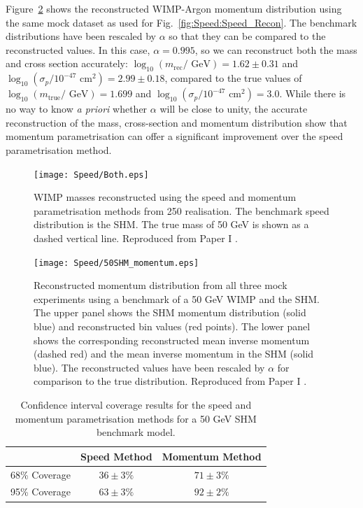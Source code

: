 Figure~\ref{fig:Speed:50SHM_momentum} shows the reconstructed WIMP-Argon momentum distribution using the same mock dataset as used for Fig.\ \ref{fig:Speed:Speed_Recon}. The benchmark distributions have been rescaled by \(\alpha\) so that they can be compared to the reconstructed values. In this case, \(\alpha = 0.995\), so we can reconstruct both the mass and cross section accurately: \(\log_{10} (m_\textrm{rec} / \textrm{ GeV}) = 1.62 \pm 0.31\) and \(\log_{10} (\sigma_p / 10^{-47} \textrm{ cm}^2) = 2.99 \pm 0.18\), compared to the true values of \(\log_{10} (m_\textrm{true} / \textrm{ GeV}) = 1.699\) and \(\log_{10} (\sigma_p / 10^{-47} \textrm{ cm}^2) = 3.0\). While there is no way to know \textit{a priori} whether \(\alpha\) will be close to unity, the accurate reconstruction of the mass, cross-section and momentum distribution show that momentum parametrisation can offer a significant improvement over the speed parametrisation method.

\begin{figure}[t]
\centering
  \texttt{[image: Speed/Both.eps]}
  \caption[Comparison of WIMP masses reconstructed using the binned speed and momentum parametrisations]{WIMP masses reconstructed using the speed and momentum parametrisation methods from 250 realisation. The benchmark speed distribution is the SHM. The true mass of 50 GeV is shown as a dashed vertical line. Reproduced from Paper I \cite{Kavanagh:2012}.}
  \label{fig:Speed:both}
\end{figure}

\begin{figure}[t]
\centering
  \texttt{[image: Speed/50SHM\_momentum.eps]}
\caption[Reconstructed momentum distribution from all three mock experiments using a benchmark of a 50 GeV WIMP and the SHM]{Reconstructed momentum distribution from all three mock experiments using a benchmark of a 50 GeV WIMP and the SHM. The upper panel shows the SHM momentum distribution (solid blue) and reconstructed bin values (red points). The lower panel shows the corresponding reconstructed mean inverse momentum (dashed red) and the mean inverse momentum in the SHM (solid blue). The reconstructed values have been rescaled by \(\alpha\) for comparison to the true distribution. Reproduced from Paper I \cite{Kavanagh:2012}.}
  \label{fig:Speed:50SHM_momentum}
\end{figure}

\begin{table}[t]
  \begin{center}
    \begin{tabular}{ccc}
    \hline\hline
    & Speed Method & Momentum Method \\
    \hline
    68\% Coverage & \(36 \pm 3 \%\) & \(71 \pm 3 \%\) \\
    95\% Coverage & \(63 \pm 3\%\) & \(92 \pm 2 \%\) \\
    \hline\hline
    \end{tabular}
  \end{center}
  \caption{Confidence interval coverage results for the speed and momentum parametrisation methods for a 50 GeV SHM benchmark model.}
\label{tab:CoverageComparison}
\end{table}

